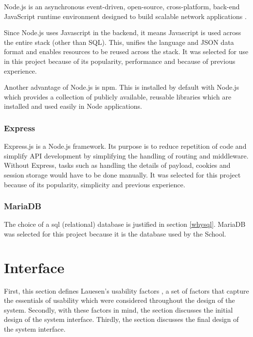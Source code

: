 Node.js is an asynchronous event-driven, open-source, cross-platform, back-end JavaScript runtime environment designed to build scalable network applications \cite{node}.

Since Node.js uses Javascript in the backend, it means Javascript is used across the entire stack (other than SQL). This, unifies the language and JSON data format and enables resources to be reused across the stack. It was selected for use in this project because of its popularity, performance and because of previous experience.

Another advantage of Node.js is \gls{npm}. This is installed by default with Node.js which provides a collection of publicly available, reusable libraries which are installed and used easily in Node applications.

\subsubsection{Express}\label{sec:express}

Express.js is a Node.js framework. Its purpose is to reduce repetition of code and simplify API development by simplifying the handling of routing and middleware. Without Express, tasks such as handling the details of payload, cookies and session storage would have to be done manually. It was selected for this project because of its popularity, simplicity and previous experience.

\subsubsection{MariaDB}\label{sec:stackdb}

The choice of a \gls{sql} (relational) database is justified in section \ref{whysql}. MariaDB was selected for this project because it is the database used by the School. 

\section{Interface}\label{sec:interface}

First, this section defines Lauesen's usability factors \cite{lauesen}, a set of factors that capture the essentials of usability which were considered throughout the design of the system. Secondly, with these factors in mind, the section discusses the initial design of the system interface. Thirdly, the section discusses the final design of the system interface.

